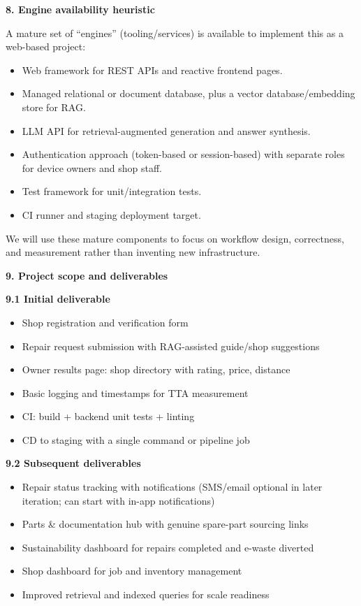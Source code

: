 \documentclass[11pt]{article}
\newcommand{\sechead}[2]{%
  \vspace{0.35cm}\noindent
  {\large\bfseries #1}\hfill{\large\itshape #2}\par
  \vspace{0.15cm}
}
\newcommand{\secheadonly}[1]{%
  \vspace{0.35cm}\noindent
  {\large\bfseries #1}\par
  \vspace{0.15cm}
}
\begin{document}
\secheadonly{8. Engine availability heuristic}
A mature set of ``engines'' (tooling/services) is available to implement this as a web-based project:
\begin{itemize}
  \item Web framework for REST APIs and reactive frontend pages.
  \item Managed relational or document database, plus a vector database/embedding store for RAG.
  \item LLM API for retrieval-augmented generation and answer synthesis.
  \item Authentication approach (token-based or session-based) with separate roles for device owners and shop staff.
  \item Test framework for unit/integration tests.
  \item CI runner and staging deployment target.
\end{itemize}
We will use these mature components to focus on workflow design, correctness, and measurement rather than inventing new infrastructure.

\sechead{9. Project scope and deliverables}{}

\sechead{9.1 Initial deliverable}{}
\begin{itemize}
  \item Shop registration and verification form
  \item Repair request submission with RAG-assisted guide/shop suggestions
  \item Owner results page: shop directory with rating, price, distance
  \item Basic logging and timestamps for TTA measurement
  \item CI: build + backend unit tests + linting
  \item CD to staging with a single command or pipeline job
\end{itemize}

\secheadonly{9.2 Subsequent deliverables}
\begin{itemize}
  \item Repair status tracking with notifications (SMS/email optional in later iteration; can start with in-app notifications)
  \item Parts \& documentation hub with genuine spare-part sourcing links
  \item Sustainability dashboard for repairs completed and e-waste diverted
  \item Shop dashboard for job and inventory management
  \item Improved retrieval and indexed queries for scale readiness
\end{itemize}
\end{document}
